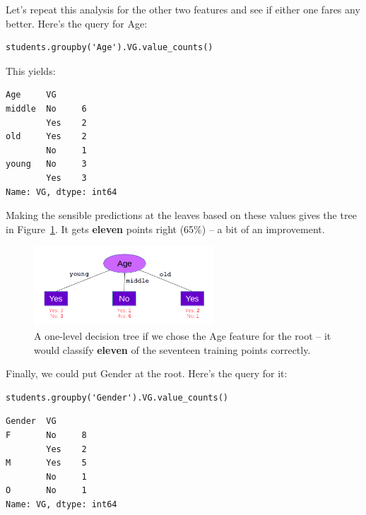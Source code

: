 Let's repeat this analysis for the other two features and see if either one
fares any better. Here's the query for \textsf{Age}:

\begin{Verbatim}[fontsize=\small,samepage=true,frame=single,framesep=3mm]
students.groupby('Age').VG.value_counts()
\end{Verbatim}

This yields:

\begin{Verbatim}[fontsize=\small,samepage=true,frame=leftline,framesep=5mm,framerule=1mm]
Age     VG 
middle  No     6
        Yes    2
old     Yes    2
        No     1
young   No     3
        Yes    3
Name: VG, dtype: int64
\end{Verbatim}

Making the sensible predictions at the leaves based on these values gives the
tree in Figure~\ref{fig:ageOnTop}. It gets \textbf{eleven} points right (65\%)
-- a bit of an improvement.

\begin{figure}[ht]
\centering
\includegraphics[width=0.6\textwidth]{ageOnTop.png}
\caption{A one-level decision tree if we chose the \textsf{Age} feature for the
root -- it would classify \textbf{eleven} of the seventeen training points
correctly.}
\label{fig:ageOnTop}
\end{figure}

Finally, we could put \textsf{Gender} at the root. Here's the query for it:

\begin{samepage}
\begin{Verbatim}[fontsize=\small,samepage=true,frame=single,framesep=3mm]
students.groupby('Gender').VG.value_counts()
\end{Verbatim}
\vspace{-.2in}

\begin{Verbatim}[fontsize=\small,samepage=true,frame=leftline,framesep=5mm,framerule=1mm]
Gender  VG 
F       No     8
        Yes    2
M       Yes    5
        No     1
O       No     1
Name: VG, dtype: int64
\end{Verbatim}
\end{samepage}

